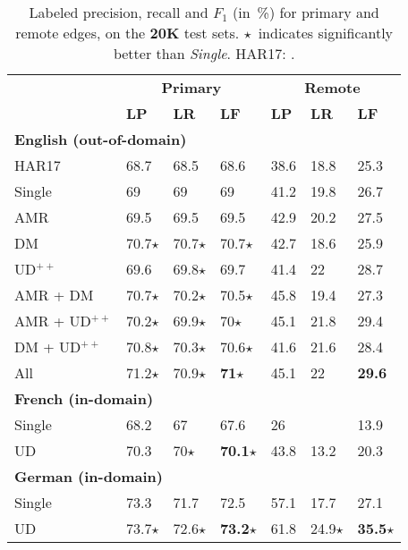 \documentclass[11pt,a4paper]{article}
\begin{document}
\begin{table}[t]
\centering
\small
\setlength\tabcolsep{3pt}
\begin{tabular}{l|lll|lll}
& \multicolumn{3}{c|}{\footnotesize \bf Primary} & \multicolumn{3}{c}{\footnotesize \bf Remote} \\
& \footnotesize \textbf{LP} & \footnotesize \textbf{LR} & \footnotesize \textbf{LF}
& \footnotesize \textbf{LP} & \footnotesize \textbf{LR} & \footnotesize \textbf{LF} \\
\hline
\multicolumn{4}{l|}{\small \bf English (out-of-domain)} & \\
\footnotesize HAR17
& 68.7 & 68.5 & 68.6 & 38.6 & 18.8 & 25.3 \\
\footnotesize Single
& 69 & 69 & 69 & 41.2 & 19.8 & 26.7 \\
\cline{1-1}
\footnotesize AMR
& 69.5 & 69.5 & 69.5 & 42.9 & 20.2 & 27.5 \\
\footnotesize DM
& 70.7$\star$ & 70.7$\star$ & 70.7$\star$ & 42.7 & 18.6 & 25.9 \\
\footnotesize UD$^{++}$
& 69.6 & 69.8$\star$ & 69.7 & 41.4 & 22 & 28.7 \\
\footnotesize AMR + DM
& 70.7$\star$ & 70.2$\star$ & 70.5$\star$ & 45.8 & 19.4 & 27.3 \\
\footnotesize AMR + UD$^{++}$
& 70.2$\star$ & 69.9$\star$ & 70$\star$ & 45.1 & 21.8 & 29.4 \\
\footnotesize DM + UD$^{++}$
& 70.8$\star$ & 70.3$\star$ & 70.6$\star$ & 41.6 & 21.6 & 28.4 \\
\footnotesize All
& 71.2$\star$ & 70.9$\star$ & \textbf{71}$\star$ & 45.1 & 22 & \textbf{29.6} \\
\hline
\multicolumn{4}{l|}{\small \bf French (in-domain)} & \\
\small Single & 68.2 & 67 & 67.6 & 26 & \enskip 9.4 & 13.9 \\
\small UD & 70.3 & 70$\star$ & \textbf{70.1}$\star$ & 43.8 & 13.2 & 20.3 \\
\hline
\multicolumn{4}{l|}{\small \bf German (in-domain)} & \\
\small Single & 73.3 & 71.7 & 72.5 & 57.1 & 17.7 & 27.1 \\
\small UD & 73.7$\star$ & 72.6$\star$ & \textbf{73.2}$\star$ & 61.8 & 24.9$\star$ & \textbf{35.5}$\star$
\end{tabular}
\caption{
Labeled precision, recall and $F_1$ (in~\%) for primary and remote edges,
on the \textbf{20K} test sets.
$\star$~indicates significantly better than \textit{Single}.
HAR17: \citet{hershcovich2017a}.}\label{tab:ood_results}
\end{table}
\end{document}
